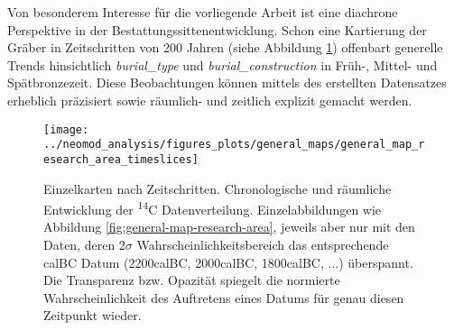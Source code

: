 \documentclass[openany,twoside,twocolumn]{book}
\begin{document}
Von besonderem Interesse für die vorliegende Arbeit ist eine diachrone
Perspektive in der Bestattungssittenentwicklung. Schon eine Kartierung
der Gräber in Zeitschritten von 200 Jahren (siehe Abbildung
\ref{fig:general-map-research-area-timeslices}) offenbart generelle
Trends hinsichtlich \emph{burial\_type} und \emph{burial\_construction}
in Früh-, Mittel- und Spätbronzezeit. Diese Beobachtungen können mittels
des erstellten Datensatzes erheblich präzisiert sowie räumlich- und
zeitlich explizit gemacht werden.

\begin{landscape}
\begin{figure}
\texttt{[image: ../neomod\_analysis/figures\_plots/general\_maps/general\_map\_research\_area\_timeslices]} \caption[Einzelkarten nach Zeitschritten]{Einzelkarten nach Zeitschritten. Chronologische und räumliche Entwicklung der \textsuperscript{14}C Datenverteilung. Einzelabbildungen wie Abbildung \ref{fig:general-map-research-area}, jeweils aber nur mit den Daten, deren $2\sigma$ Wahrscheinlichkeitsbereich das entsprechende calBC Datum (2200calBC, 2000calBC, 1800calBC, ...) überspannt. Die Transparenz bzw. Opazität spiegelt die normierte Wahrscheinlichkeit des Auftretens eines Datums für genau diesen Zeitpunkt wieder.}\label{fig:general-map-research-area-timeslices}
\end{figure}
\end{landscape}
\end{document}
